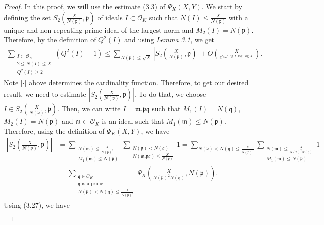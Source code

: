 \documentclass[12pt]{article}
\numberwithin{equation}{section}
\numberwithin{equation}{section}
\begin{document}
\begin{proof}
    In this proof, we will use the estimate (3.3) of $\Psi_K(X,Y)$. We start by defining the set $S_2\left(\frac{X}{N(\mathfrak{p})},\mathfrak{p}\right)$ of ideals $I \subset \mathcal{O}_K$ such that $N(I) \leq \frac{X}{N(\mathfrak{p})}$ with a unique and non-repeating prime ideal of the largest norm and $M_2(I)=N(\mathfrak{p})$. Therefore, by the definition of $Q^2(I)$ and using \textit{Lemma 3.1}, we get
    \begin{align}
        \sum_{\substack{I \subset \mathcal{O}_K \\ 2 \leq N(I) \leq X \\ Q^2(I) \geq 2}}(Q^2(I)-1) \leq \sum_{N(\mathfrak{p}) \leq \sqrt{X}} \left|S_2\left(\frac{X}{N(\mathfrak{p})},\mathfrak{p}\right)\right| +  O\left(\frac{X}{e^{c_3\sqrt{\log X\log\log X}}}\right).
    \end{align}
    Note $|\cdot|$ above determines the cardinality function. Therefore, to get our desired result, we need to estimate $\left|S_2\left(\frac{X}{N(\mathfrak{p})},\mathfrak{p}\right)\right|$. To do that, we choose $I \in S_2\left(\frac{X}{N(\mathfrak{p})},\mathfrak{p}\right)$. Then, we can write $I = \mathfrak{m.pq}$ such that $M_1(I)=N(\mathfrak{q})$, $M_2(I)=N(\mathfrak{p})$ and $\mathfrak{m} \subset \mathcal{O}_K$ is an ideal such that $M_1(\mathfrak{m}) \leq N(\mathfrak{p})$. Therefore, using the definition of $\Psi_K(X,Y)$, we have
    \begin{align}
        \left|S_2\left(\frac{X}{N(\mathfrak{p})},\mathfrak{p}\right)\right| &= \sum_{\substack{N(\mathfrak{m}) \leq \frac{X}{N(\mathfrak{p})^3} \\ M_1(\mathfrak{m})\leq N(\mathfrak{p})}}\sum_{\substack{N(\mathfrak{p})<N(\mathfrak{q}) \\ N(\mathfrak{m.pq})\leq \frac{X}{N(\mathfrak{p})}}}1 = \sum_{N(\mathfrak{p})<N(\mathfrak{q})\leq \frac{X}{N(p)^2}}\sum_{\substack{N(\mathfrak{m})\leq \frac{X}{N(\mathfrak{p})^2N(\mathfrak{q})} \\ M_1(\mathfrak{m})\leq N(\mathfrak{p})}} 1 \nonumber \\
    &= \sum_{\substack{\mathfrak{q} \in \mathcal{O}_K \\ \mathfrak{q} \text{ is a prime} \\N(\mathfrak{p})<N(\mathfrak{q})\leq \frac{X}{N(\mathfrak{p})^2}}} \Psi_K\left(\frac{X}{N(\mathfrak{p})^2N(\mathfrak{q})},N(\mathfrak{p})\right).
    \end{align}
    Using (3.27), we have
\begin{align}

\end{align}
\end{proof}
\end{document}
